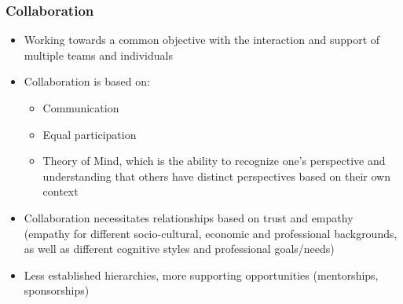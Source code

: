 \documentclass{article}
\begin{document}
\subsubsection{Collaboration}
\begin{itemize}
    \item Working towards a common objective with the interaction and support of multiple teams and individuals 
    
    \item Collaboration is based on: 
    \begin{itemize}
        \item Communication
        
        \item Equal participation
        
        \item Theory of Mind, which is the ability to recognize one's perspective and understanding that others have distinct perspectives based on their own context
    \end{itemize}
    
    \item Collaboration necessitates relationships based on trust and empathy (empathy for different socio-cultural, economic and professional backgrounds, as well as different cognitive styles and professional goals/needs)
    
    \item Less established hierarchies, more supporting opportunities (mentorships, sponsorships)
\end{itemize}
\end{document}
